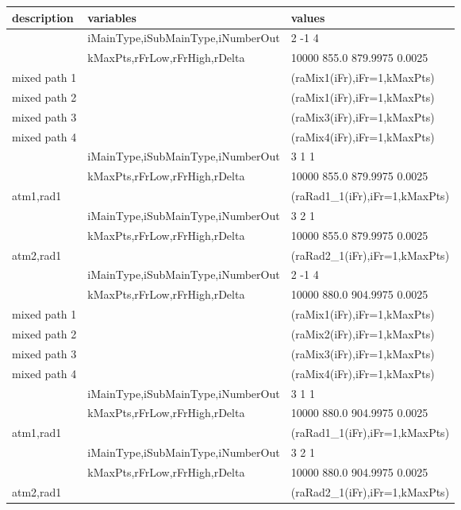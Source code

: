\documentclass[12pt]{article}
\newlength{\colwidth}
\begin{document}
{{{{\begin{longtable}{llp{\colwidth}}
description&     variables                 & values\\ \hline                  
              & iMainType,iSubMainType,iNumberOut  & 2 -1 4\\
              & kMaxPts,rFrLow,rFrHigh,rDelta  & 10000 855.0 879.9975 0.0025 \\
mixed path 1  & & (raMix1(iFr),iFr=1,kMaxPts)\\
mixed path 2  & & (raMix1(iFr),iFr=1,kMaxPts)\\
mixed path 3  & & (raMix3(iFr),iFr=1,kMaxPts)\\
mixed path 4  & & (raMix4(iFr),iFr=1,kMaxPts)\\
              & iMainType,iSubMainType,iNumberOut  & 3 1 1\\
              & kMaxPts,rFrLow,rFrHigh,rDelta  & 10000 855.0 879.9975 0.0025 \\
atm1,rad1     & & (raRad1\_1(iFr),iFr=1,kMaxPts)\\
              & iMainType,iSubMainType,iNumberOut  & 3 2 1\\
              & kMaxPts,rFrLow,rFrHigh,rDelta  & 10000 855.0 879.9975 0.0025 \\
atm2,rad1     & & (raRad2\_1(iFr),iFr=1,kMaxPts)\\
              & iMainType,iSubMainType,iNumberOut  & 2 -1 4\\
              & kMaxPts,rFrLow,rFrHigh,rDelta  & 10000 880.0 904.9975 0.0025 \\
mixed path 1  & & (raMix1(iFr),iFr=1,kMaxPts)\\
mixed path 2  & & (raMix2(iFr),iFr=1,kMaxPts)\\
mixed path 3  & & (raMix3(iFr),iFr=1,kMaxPts)\\
mixed path 4  & & (raMix4(iFr),iFr=1,kMaxPts)\\
              & iMainType,iSubMainType,iNumberOut  & 3 1 1\\
              & kMaxPts,rFrLow,rFrHigh,rDelta  & 10000 880.0 904.9975 0.0025 \\
atm1,rad1     & & (raRad1\_1(iFr),iFr=1,kMaxPts)\\
              & iMainType,iSubMainType,iNumberOut  & 3 2 1\\
              & kMaxPts,rFrLow,rFrHigh,rDelta  & 10000 880.0 904.9975 0.0025 \\
atm2,rad1     & & (raRad2\_1(iFr),iFr=1,kMaxPts)\\
\end{longtable}

}}}}
\end{document}
